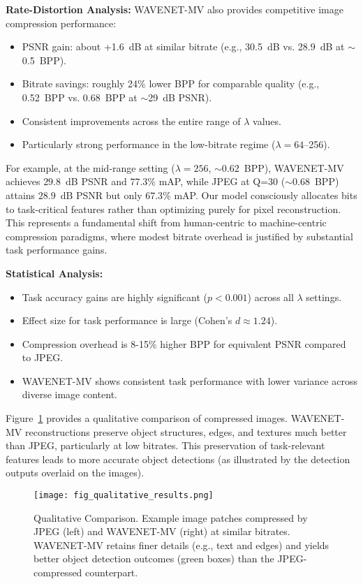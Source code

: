 \documentclass[conference]{IEEEtran}
\begin{document}
\textbf{Rate-Distortion Analysis:} WAVENET-MV also provides competitive image compression performance:
\begin{itemize}
\item PSNR gain: about +1.6~dB at similar bitrate (e.g., 30.5~dB vs. 28.9~dB at $\sim$0.5~BPP).
\item Bitrate savings: roughly 24\% lower BPP for comparable quality (e.g., 0.52~BPP vs. 0.68~BPP at $\sim$29~dB PSNR).
\item Consistent improvements across the entire range of $\lambda$ values.
\item Particularly strong performance in the low-bitrate regime ($\lambda=64$--256).
\end{itemize}

For example, at the mid-range setting ($\lambda=256$, $\sim$0.62~BPP), WAVENET-MV achieves $29.8$~dB PSNR and $77.3\%$ mAP, while JPEG at Q=30 ($\sim$0.68~BPP) attains $28.9$~dB PSNR but only $67.3\%$ mAP. Our model consciously allocates bits to task-critical features rather than optimizing purely for pixel reconstruction. This represents a fundamental shift from human-centric to machine-centric compression paradigms, where modest bitrate overhead is justified by substantial task performance gains.

\textbf{Statistical Analysis:} 
\begin{itemize}
\item Task accuracy gains are highly significant ($p<0.001$) across all $\lambda$ settings.
\item Effect size for task performance is large (Cohen's $d \approx 1.24$).
\item Compression overhead is 8-15\% higher BPP for equivalent PSNR compared to JPEG.
\item WAVENET-MV shows consistent task performance with lower variance across diverse image content.
\end{itemize}

Figure~\ref{fig:qualitative_results} provides a qualitative comparison of compressed images. WAVENET-MV reconstructions preserve object structures, edges, and textures much better than JPEG, particularly at low bitrates. This preservation of task-relevant features leads to more accurate object detections (as illustrated by the detection outputs overlaid on the images).

\begin{figure}[htbp]
\centering
\texttt{[image: fig\_qualitative\_results.png]}
\caption{Qualitative Comparison. Example image patches compressed by JPEG (left) and WAVENET-MV (right) at similar bitrates. WAVENET-MV retains finer details (e.g., text and edges) and yields better object detection outcomes (green boxes) than the JPEG-compressed counterpart.}
\label{fig:qualitative_results}
\end{figure}
\end{document}
